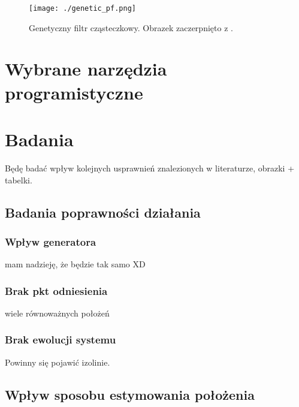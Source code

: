 \documentclass[10pt,a4paper]{article}
\begin{document}
\begin{figure}[H]
	\begin{center}
		\texttt{[image: ./genetic\_pf.png]}
		\caption{Genetyczny filtr cząsteczkowy. Obrazek zaczerpnięto z \cite{pfgen}.}
	\end{center}
\end{figure}

\section{Wybrane narzędzia programistyczne}
\section{Badania} \label{przeg}
Będę badać wpływ kolejnych usprawnień znalezionych w literaturze, obrazki + tabelki.
\subsection{Badania poprawności działania}
\subsubsection{Wpływ generatora}
mam nadzieję, że będzie tak samo XD
\subsubsection{Brak pkt odniesienia}
wiele równoważnych położeń
\subsubsection{Brak ewolucji systemu}
Powinny się pojawić izolinie.

\subsection{Wpływ sposobu estymowania położenia}
\end{document}
